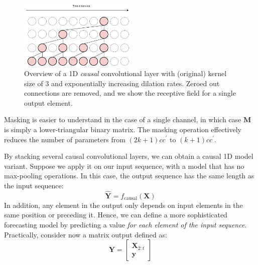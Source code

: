 \begin{figure}
    \centering
    \hspace{1em}\includegraphics[width=0.5\textwidth]{images/causal_convolutions}
    \caption{Overview of a 1D \textit{causal} convolutional layer with (original) kernel size of $3$ and exponentially increasing dilation rates. Zeroed out connections are removed, and we show the receptive field for a single output element.}
    \label{fig:causal_convolutions}
\end{figure}

Masking is easier to understand in the case of a single channel, in which case $\mathbf{M}$ is simply a lower-triangular binary matrix. The masking operation effectively reduces the number of parameters from $(2k+1)cc^\prime$ to $(k+1)cc^\prime$. 

By stacking several causal convolutional layers, we can obtain a causal 1D model variant. Suppose we apply it on our input sequence, with a model that has no max-pooling operations. In this case, the output sequence has the same length as the input sequence:
%
$$
\widehat{\mathbf{Y}} = f_{\text{causal}}(\mathbf{X})
$$
%
In addition, any element in the output only depends on input elements in the same position or preceding it. Hence, we can define a more sophisticated forecasting model by predicting a value \textit{for each element of the input sequence}. Practically, consider now a matrix output defined as:
%
$$
\mathbf{Y} = \begin{bmatrix} \mathbf{X}_{2:t} \\\mathbf{y} \end{bmatrix}
$$


